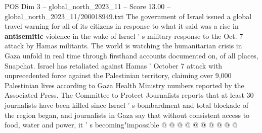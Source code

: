 \begin{textsample}{POS Dim 3 – global\_north\_2023\_11 – Score 13.00 – global\_north\_2023\_11/200018949.txt}
The government of Israel issued a global travel warning for all of its citizens in response to what it said was a rise in \textbf{antisemitic} violence in the wake of Israel ' s military response to the Oct. 7 attack by Hamas militants.
The world is watching the humanitarian crisis in Gaza unfold in real time through firsthand accounts documented on, of all places, Snapchat.
Israel has retaliated against Hamas ' October 7 attack with unprecedented force against the Palestinian territory, claiming over 9,000 Palestinian lives according to Gaza Health Ministry numbers reported by the Associated Press.
The Committee to Protect Journalists reports that at least 30 journalists have been killed since Israel ' s bombardment and total blockade of the region began, and journalists in Gaza say that without consistent access to food, water and power, it ' s becoming"impossible @ @ @ @ @ @ @ @ @ @

\end{textsample}
